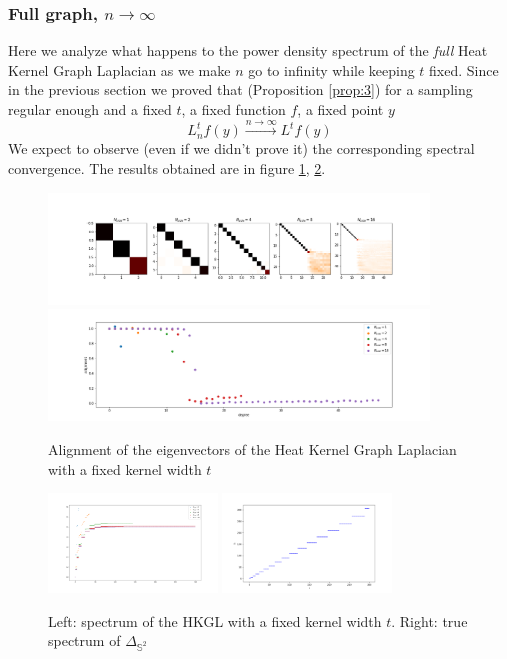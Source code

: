 \subsubsection{Full graph, $n\to\infty$}\label{sec:Chapter1: n to infty}
Here we analyze what happens to the power density spectrum of the \textit{full} Heat Kernel Graph Laplacian as we make $n$ go to infinity while keeping $t$ fixed. Since in the previous section we proved that (Proposition \ref{prop:3}) for a sampling regular enough and a fixed $t$, a fixed function $f$, a fixed point $y$
$$L_n^tf(y)\xrightarrow{n\to\infty}L^tf(y)$$
We expect to observe (even if we didn't prove it) the corresponding spectral convergence. The results obtained are in figure \ref{fig:n to infinity1}, \ref{fig:n to infinity3}.

\begin{figure}[h!]
	\centering
	\includegraphics[width=0.9\textwidth]{../codes/02.HeatKernelGraphLaplacian/HEALPix/06_figures/n.png}
	\includegraphics[width=0.9\textwidth]{../codes/02.HeatKernelGraphLaplacian/HEALPix/06_figures/n_diagonal.png}	
	\caption{\label{fig:n to infinity1}Alignment of the eigenvectors of the Heat Kernel Graph Laplacian with a fixed kernel width $t$}
	
\end{figure}
\begin{figure}[h!]
	\centering
	\includegraphics[width=0.4\textwidth]{../codes/02.HeatKernelGraphLaplacian/HEALPix/06_figures/n_eigenvalues.png}
		\includegraphics[width=0.4\textwidth]{figs/chapter1/trueeigenvalues.png}	
	\caption{\label{fig:n to infinity3}Left: spectrum of the HKGL with a fixed kernel width $t$. Right: true spectrum of $\Delta_{\mathbb S^2}$}
\end{figure}


